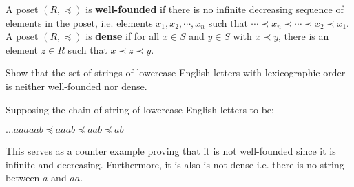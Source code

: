 \documentclass[addpoints]{exam}
\begin{document}
\begin{questions}
\begin{solution}
    
  \end{solution}


  
\question 
A poset $(R, \preccurlyeq)$ is \textbf{well-founded} if there is no infinite decreasing sequence of elements in the poset, i.e. elements $x_1, x_2, \cdots, x_n$ such that $\cdots \prec x_n \prec \cdots  \prec x_2 \prec x_1$. A poset $(R, \preccurlyeq)$ is \textbf{dense} if for all $x \in S$ and $y \in S$ with $x \prec y$, there is an element $z \in R$ such that $x \prec z \prec y$.

Show that the set of strings of lowercase English letters with lexicographic order is neither well-founded nor dense.


  \begin{solution}
    Supposing the chain of string of lowercase English letters to be:
    \begin{center}
     $... aaaaab \preccurlyeq aaab \preccurlyeq aab \preccurlyeq ab$
    \end{center}
 
    This serves as a counter example proving that it is not well-founded since it is infinite and decreasing.\newline
    Furthermore, it is also is not dense  i.e. there is no string between $a$ and $aa$.
  \end{solution}


\end{questions}
\end{document}
